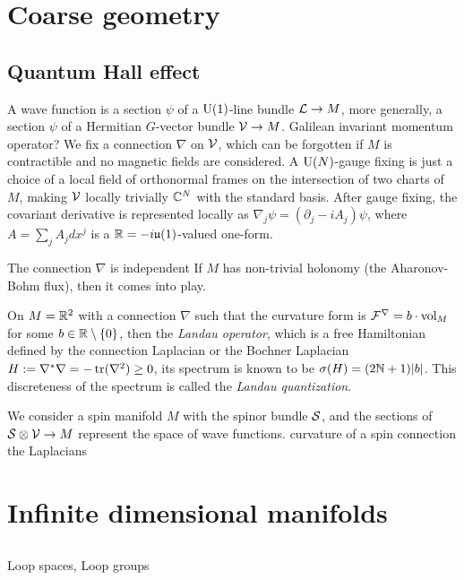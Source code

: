 \documentclass{../../large}
\begin{document}
\chapter{Coarse geometry}

\section{Quantum Hall effect}
A wave function is a section $\psi$ of a $\mathrm{U}(1)$-line bundle $\mathcal{L}\to M$, more generally, a section $\psi$ of a Hermitian $G$-vector bundle $\mathcal{V}\to M$.
Galilean invariant momentum operator?
We fix a connection $\nabla$ on $\mathcal{V}$, which can be forgotten if $M$ is contractible and no magnetic fields are considered.
A $\mathrm{U}(N)$-gauge fixing is just a choice of a local field of orthonormal frames on the intersection of two charts of $M$, making $\mathcal{V}$ locally trivially $\mathbb{C}^N$ with the standard basis.
After gauge fixing, the covariant derivative is represented locally as $\nabla_j\psi=(\partial_j-iA_j)\psi$, where $A=\sum_jA_jdx^j$ is a $\mathbb{R}=-i\mathfrak{u}(1)$-valued one-form.

The connection $\nabla$ is independent
If $M$ has non-trivial holonomy (the Aharonov-Bohm flux), then it comes into play.


On $M=\mathbb{R}^2$ with a connection $\nabla$ such that the curvature form is $\mathcal{F}^\nabla=b\cdot\operatorname{vol}_M$ for some $b\in\mathbb{R}\setminus\{0\}$, then the \emph{Landau operator}, which is a free Hamiltonian defined by the connection Laplacian or the Bochner Laplacian $H:=\nabla^*\nabla=-\operatorname{tr}(\nabla^2)\ge0$, its spectrum is known to be $\sigma(H)=(2\mathbb{N}+1)|b|$.
This discreteness of the spectrum is called the \emph{Landau quantization}.


We consider a spin manifold $M$ with the spinor bundle $\mathcal{S}$, and the sections of $\mathcal{S}\otimes\mathcal{V}\to M$ represent the space of wave functions.
curvature of a spin connection
the Laplacians





\chapter{Infinite dimensional manifolds}
\section{}

Loop spaces,
Loop groups
\end{document}

